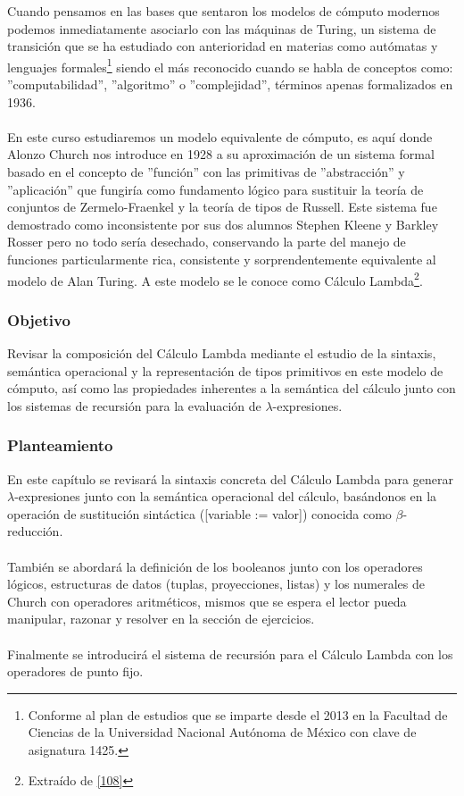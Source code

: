 Cuando pensamos en las bases que sentaron los modelos de cómputo modernos podemos inmediatamente asociarlo con las máquinas de Turing, un sistema de transición que se ha estudiado con anterioridad en materias como autómatas y lenguajes formales\footnote{Conforme al plan de estudios que se imparte desde el 2013 en la Facultad de Ciencias de la Universidad Nacional Autónoma de México con clave de asignatura 1425. } siendo el más reconocido cuando se habla de conceptos como: ''computabilidad'', ''algoritmo'' o ''complejidad'', términos apenas formalizados en 1936.\\\\
En este curso estudiaremos un modelo equivalente de cómputo, es aquí donde Alonzo Church nos introduce en 1928 a su aproximación de un sistema formal basado en el concepto de ''función'' con las primitivas de ''abstracción'' y ''aplicación'' que fungiría como fundamento lógico para sustituir la teoría de conjuntos de Zermelo-Fraenkel y la teoría de tipos de Russell. Este sistema fue demostrado como inconsistente por sus dos alumnos Stephen Kleene y Barkley Rosser pero no todo sería desechado, conservando la parte del manejo de funciones particularmente rica, consistente y sorprendentemente equivalente al modelo de Alan Turing. A este modelo se le conoce como Cálculo Lambda\footnote{Extraído de  \hyperlink{108}{[108]}}.\\


\subsubsection{Objetivo}
Revisar la composición del Cálculo Lambda mediante el estudio de la sintaxis, semántica operacional y la representación de tipos primitivos en este modelo de cómputo, así como las propiedades inherentes a la semántica del cálculo junto con los sistemas de recursión para la evaluación de $\lambda$-expresiones. \\ 

\subsubsection{Planteamiento}
En este capítulo se revisará la sintaxis concreta del Cálculo Lambda para generar $\lambda$-expresiones junto con
la semántica operacional del cálculo, basándonos en la operación de sustitución sintáctica ([variable := valor]) conocida como $\beta$-reducción.\\\\
También se abordará la definición de los booleanos junto con los operadores lógicos, estructuras de datos (tuplas, proyecciones, listas) y los numerales de Church con operadores aritméticos, mismos que se espera el lector pueda manipular, razonar y resolver en la sección de ejercicios. \\\\
Finalmente se introducirá el sistema de recursión para el Cálculo Lambda con los operadores de punto fijo.



